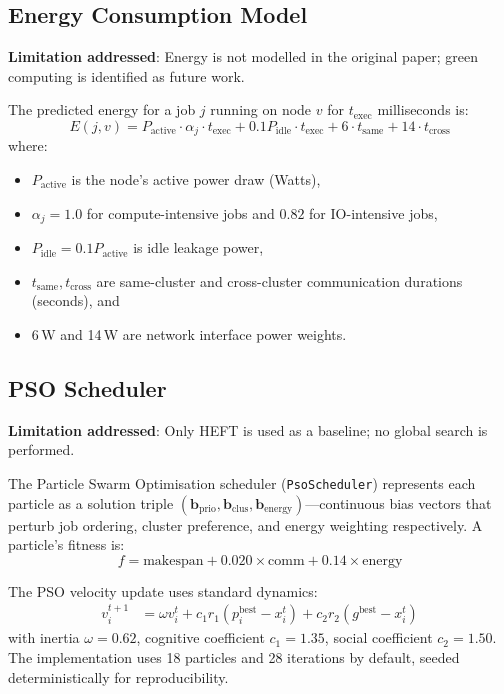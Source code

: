 \documentclass[12pt,a4paper]{article}
\begin{document}
\subsection{Energy Consumption Model}

\textbf{Limitation addressed}: Energy is not modelled in the original paper; green computing is identified as future work.

The predicted energy for a job $j$ running on node $v$ for $t_{\text{exec}}$ milliseconds is:
\begin{equation}
    E(j, v) = P_{\text{active}} \cdot \alpha_j \cdot t_{\text{exec}} + 0.1 P_{\text{idle}} \cdot t_{\text{exec}} + 6 \cdot t_{\text{same}} + 14 \cdot t_{\text{cross}}
    \label{eq:energy}
\end{equation}
where:
\begin{itemize}[leftmargin=1.5cm]
    \item $P_{\text{active}}$ is the node's active power draw (Watts),
    \item $\alpha_j = 1.0$ for compute-intensive jobs and $0.82$ for IO-intensive jobs,
    \item $P_{\text{idle}} = 0.1 P_{\text{active}}$ is idle leakage power,
    \item $t_{\text{same}}, t_{\text{cross}}$ are same-cluster and cross-cluster communication durations (seconds), and
    \item 6\,W and 14\,W are network interface power weights.
\end{itemize}

\subsection{PSO Scheduler}

\textbf{Limitation addressed}: Only HEFT is used as a baseline; no global search is performed.

The Particle Swarm Optimisation scheduler (\texttt{PsoScheduler}) represents each particle as a solution triple $(\mathbf{b}_{\text{prio}}, \mathbf{b}_{\text{clus}}, \mathbf{b}_{\text{energy}})$---continuous bias vectors that perturb job ordering, cluster preference, and energy weighting respectively. A particle's fitness is:
\begin{equation}
    f = \text{makespan} + 0.020 \times \text{comm} + 0.14 \times \text{energy}
    \label{eq:pso_obj}
\end{equation}

The PSO velocity update uses standard dynamics:
\begin{align}
    v_{i}^{t+1} &= \omega v_i^t + c_1 r_1 (p_i^{\text{best}} - x_i^t) + c_2 r_2 (g^{\text{best}} - x_i^t)
    \label{eq:pso_velocity}
\end{align}
with inertia $\omega = 0.62$, cognitive coefficient $c_1 = 1.35$, social coefficient $c_2 = 1.50$. The implementation uses 18 particles and 28 iterations by default, seeded deterministically for reproducibility.
\end{document}
